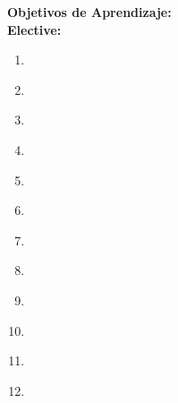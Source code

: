 \noindent \textbf{Objetivos de Aprendizaje:}\\
\noindent \textbf{Elective:}
\begin{enumerate}
	\setcounter{enumi}{0}
	\item \CNProcessingLOExplainTheDefining\xspace[\CNProcessingLOExplainTheDefiningLevel]\label{sec:BOK:CNProcessingLOExplainTheDefining}
	\item \CNProcessingLOAnalyze\xspace[\CNProcessingLOAnalyzeLevel]\label{sec:BOK:CNProcessingLOAnalyze}
	\item \CNProcessingLOIdentifyOr\xspace[\CNProcessingLOIdentifyOrLevel]\label{sec:BOK:CNProcessingLOIdentifyOr}
	\item \CNProcessingLODescribeTheConverting\xspace[\CNProcessingLODescribeTheConvertingLevel]\label{sec:BOK:CNProcessingLODescribeTheConverting}
	\item \CNProcessingLOSummarizeThe\xspace[\CNProcessingLOSummarizeTheLevel]\label{sec:BOK:CNProcessingLOSummarizeThe}
	\item \CNProcessingLOExplainHowRepresented\xspace[\CNProcessingLOExplainHowRepresentedLevel]\label{sec:BOK:CNProcessingLOExplainHowRepresented}
	\item \CNProcessingLOApply\xspace[\CNProcessingLOApplyLevel]\label{sec:BOK:CNProcessingLOApply}
	\item \CNProcessingLODescribeTheOfScalability\xspace[\CNProcessingLODescribeTheOfScalabilityLevel]\label{sec:BOK:CNProcessingLODescribeTheOfScalability}
	\item \CNProcessingLODescribeTheParallelism\xspace[\CNProcessingLODescribeTheParallelismLevel]\label{sec:BOK:CNProcessingLODescribeTheParallelism}
	\item \CNProcessingLOCompareAnd\xspace[\CNProcessingLOCompareAndLevel]\label{sec:BOK:CNProcessingLOCompareAnd}
	\item \CNProcessingLOIdentifyTheCorrectness\xspace[\CNProcessingLOIdentifyTheCorrectnessLevel]\label{sec:BOK:CNProcessingLOIdentifyTheCorrectness}
	\item \CNProcessingLODesignCode\xspace[\CNProcessingLODesignCodeLevel]\label{sec:BOK:CNProcessingLODesignCode}
\end{enumerate}


